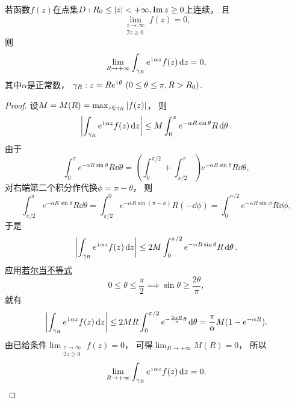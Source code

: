 \begin{lemma}[若尔当引理]\label{theorem:留数定理.计算积分路径上没有奇点的无穷限积分.引理2}
若函数\(f(z)\)在点集\(D: R_0 \leq \abs{z} < +\infty, \Im z \geq 0\)上连续，
且\begin{equation*}
	\lim_{\substack{z\to\infty \\ \Im z \geq 0}} f(z) = 0,
\end{equation*}
则\begin{equation}
	\lim_{R\to+\infty} \int_{\gamma_R} e^{\kern1pt\mathrm{i}\kern1pt\alpha z} f(z) \dd{z} = 0,
\end{equation}
其中\(\alpha\)是正常数，
\(\gamma_R: z = R e^{\iu\theta}\ (0\leq\theta\leq\pi, R>R_0)\).
\begin{proof}
设\(M = M(R) = \max_{z \in \gamma_R} \abs{f(z)}\)，
则\begin{equation*}
	\abs{ \int_{\gamma_R} e^{\kern1pt\mathrm{i}\kern1pt\alpha z} f(z) \dd{z} }
	\leq M \int_0^\pi e^{-\alpha R \sin\theta} R \dd{\theta}.
\end{equation*}
由于\begin{equation*}
	\int_0^\pi e^{-\alpha R \sin\theta} R \dd{\theta}
	= \left(\int_0^{\pi/2} + \int_{\pi/2}^\pi\right)
	e^{-\alpha R \sin\theta} R \dd{\theta},
\end{equation*}
对右端第二个积分作代换\(\phi=\pi-\theta\)，
则\begin{equation*}
	\int_{\pi/2}^\pi e^{-\alpha R \sin\theta} R \dd{\theta}
	= \int_{\pi/2}^0 e^{-\alpha R \sin(\pi-\phi)} R (-\dd{\phi})
	= \int_0^{\pi/2} e^{-\alpha R \sin\phi} R \dd{\phi},
\end{equation*}
于是\begin{equation*}
	\abs{ \int_{\gamma_R} e^{\kern1pt\mathrm{i}\kern1pt\alpha z} f(z) \dd{z} }
	\leq 2M \int_0^{\pi/2} e^{-\alpha R \sin\theta} R \dd{\theta}.
\end{equation*}
应用\hyperref[equation:微分中值定理.若尔当不等式]{若尔当不等式}\begin{equation*}
	0\leq\theta\leq\frac{\pi}{2}
	\implies
	\sin\theta\geq\frac{2\theta}{\pi},
\end{equation*}
就有\begin{equation*}
	\abs{ \int_{\gamma_R} e^{\kern1pt\mathrm{i}\kern1pt\alpha z} f(z) \dd{z} }
	\leq 2MR \int_0^{\pi/2} e^{-\frac{2\alpha R}{\pi}\theta} \dd{\theta}
	= \frac{\pi}{\alpha} M (1-e^{-\alpha R}).
\end{equation*}
由已给条件\(\lim_{\substack{z\to\infty \\ \Im z \geq 0}} f(z) = 0\)，
可得\(\lim_{R\to+\infty} M(R) = 0\)，
所以\begin{equation*}
	\lim_{R\to+\infty} \int_{\gamma_R} e^{\kern1pt\mathrm{i}\kern1pt\alpha z} f(z) \dd{z} = 0.
	\qedhere
\end{equation*}
\end{proof}
\end{lemma}

